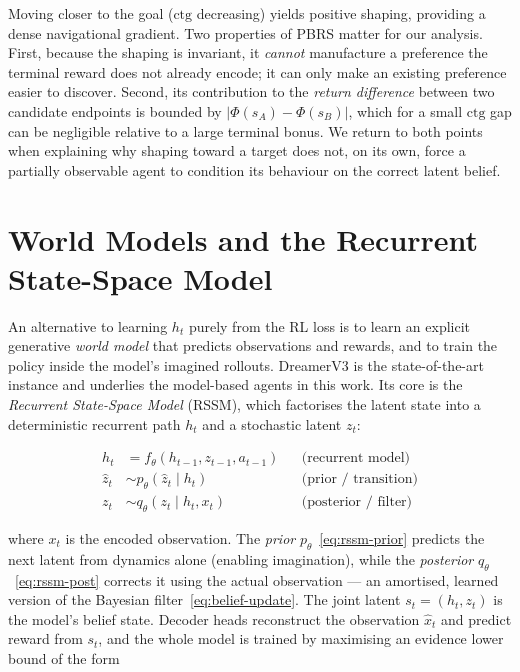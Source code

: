 Moving closer to the goal ($\mathrm{ctg}$ decreasing) yields positive shaping,
providing a dense navigational gradient. Two properties of PBRS matter for our
analysis. First, because the shaping is invariant, it \emph{cannot} manufacture
a preference the terminal reward does not already encode; it can only make an
existing preference easier to discover. Second, its contribution to the
\emph{return difference} between two candidate endpoints is bounded by
$\lvert \Phi(s_A) - \Phi(s_B)\rvert$, which for a small
$\mathrm{ctg}$ gap can be negligible relative to a large terminal bonus. We
return to both points when explaining why shaping toward a target does not, on
its own, force a partially observable agent to condition its behaviour on the
correct latent belief.

\section{World Models and the Recurrent State-Space Model}
\label{sec:bg-worldmodel}

An alternative to learning $h_t$ purely from the RL loss is to learn an explicit
generative \emph{world model} that predicts observations and rewards, and to
train the policy inside the model's imagined rollouts. DreamerV3
\citep{hafner2023mastering,hafner2020dream} is the state-of-the-art instance and
underlies the model-based agents in this work. Its core is the \emph{Recurrent
State-Space Model} (RSSM), which factorises the latent state into a
deterministic recurrent path $h_t$ and a stochastic latent $z_t$:

\begin{align}
    h_t         &= f_\theta(h_{t-1}, z_{t-1}, a_{t-1}) && \text{(recurrent model)} \label{eq:rssm-h}\\
    \hat{z}_t   &\sim p_\theta(\hat{z}_t \mid h_t)     && \text{(prior / transition)} \label{eq:rssm-prior}\\
    z_t         &\sim q_\theta(z_t \mid h_t, x_t)      && \text{(posterior / filter)} \label{eq:rssm-post}
\end{align}

where $x_t$ is the encoded observation. The \emph{prior}
$p_\theta$~\eqref{eq:rssm-prior} predicts the next latent from dynamics alone
(enabling imagination), while the \emph{posterior}
$q_\theta$~\eqref{eq:rssm-post} corrects it using the actual observation --- an
amortised, learned version of the Bayesian filter~\eqref{eq:belief-update}. The
joint latent $s_t = (h_t, z_t)$ is the model's belief state. Decoder heads
reconstruct the observation $\hat{x}_t$ and predict reward from $s_t$, and the
whole model is trained by maximising an evidence lower bound of the form

